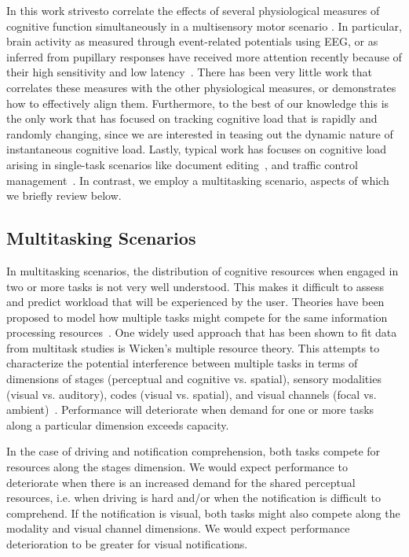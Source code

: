 In this work strivesto correlate the effects of several physiological measures of cognitive function simultaneously in a multisensory motor scenario . In particular, brain activity as measured through event-related potentials using EEG, or as inferred from pupillary responses have received more attention recently because of their high sensitivity and low latency~\cite{antonenko2010, marshall2007, klingner2010}. There has been very little work that correlates these measures with the other physiological measures, or demonstrates how to effectively align them. Furthermore, to the best of our knowledge this is the only work that has focused on tracking cognitive load that is rapidly and randomly changing, since we are interested in teasing out the dynamic nature of instantaneous cognitive load.  Lastly, typical work has focuses on cognitive load arising in single-task scenarios like document editing~\cite{iqbal2005}, and traffic control management~\cite{shi2007}. In contrast, we employ a multitasking scenario, aspects of which we briefly review below.


\subsection{Multitasking Scenarios}
In multitasking scenarios, the distribution of cognitive resources when engaged in two or more tasks is not very well understood. This makes it difficult to assess and predict workload that will be experienced by the user. Theories have been proposed to model how multiple tasks might compete for the same information processing resources~\cite{wickens2008, baddeley2003}. One widely used approach that has been shown to fit data from multitask studies is Wicken's multiple resource theory. This attempts to characterize the potential interference between multiple tasks in terms of dimensions of stages (perceptual and cognitive vs. spatial), sensory modalities (visual vs. auditory), codes (visual vs. spatial), and visual channels (focal vs. ambient)~\cite{wickens2008}. Performance will deteriorate when demand for one or more tasks along a particular dimension exceeds capacity. 

In the case of driving and notification comprehension, both tasks compete for resources along the stages dimension. We would expect performance to deteriorate when there is an increased demand for the shared perceptual resources, i.e. when driving is hard and/or when the notification is difficult to comprehend. If the notification is visual, both tasks might also compete along the modality and visual channel dimensions. We would expect performance deterioration to be greater for visual notifications. 

